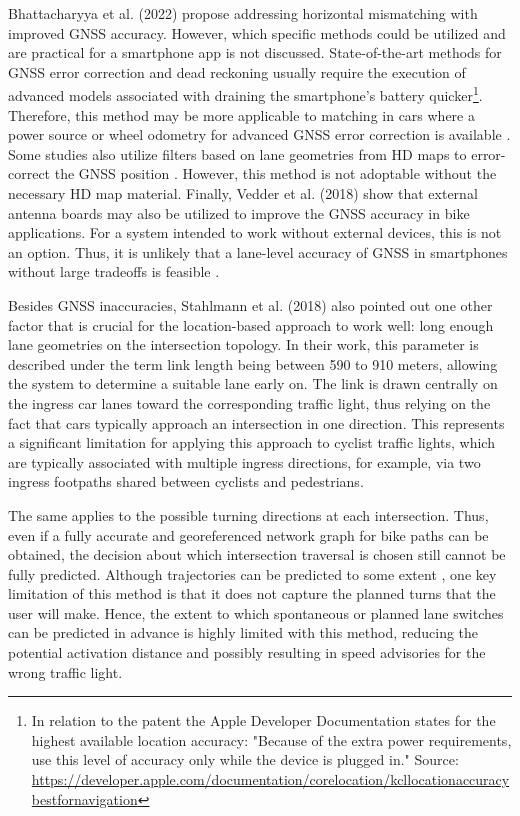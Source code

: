 Bhattacharyya et al. (2022) \cite{bhattacharyya_assessing_2022} propose addressing horizontal mismatching with improved GNSS accuracy. However, which specific methods could be utilized and are practical for a smartphone app is not discussed. State-of-the-art methods for GNSS error correction and dead reckoning usually require the execution of advanced models \cite{werner_machine_2020} associated with draining the smartphone's battery quicker\footnote{In relation to the patent \cite{werner_machine_2020} the Apple Developer Documentation states for the highest available location accuracy: "Because of the extra power requirements, use this level of accuracy only while the device is plugged in." Source: \url{https://developer.apple.com/documentation/corelocation/kcllocationaccuracybestfornavigation}}. Therefore, this method may be more applicable to matching in cars where a power source or wheel odometry for advanced GNSS error correction is available \cite{merriaux_wheel_2014}. Some studies also utilize filters based on lane geometries from HD maps to error-correct the GNSS position \cite{toledo-moreo_lane-level_2010, li_lane-level_2017}. However, this method is not adoptable without the necessary HD map material. Finally, Vedder et al. (2018) \cite{vedder_accurate_2018} show that external antenna boards may also be utilized to improve the GNSS accuracy in bike applications. For a system intended to work without external devices, this is not an option. Thus, it is unlikely that a lane-level accuracy of GNSS in smartphones without large tradeoffs is feasible \cite{lindsey_feasibility_2013}.

Besides GNSS inaccuracies, Stahlmann et al. (2018) \cite{stahlmann_exploring_2018} also pointed out one other factor that is crucial for the location-based approach to work well: long enough lane geometries on the intersection topology. In their work, this parameter is described under the term link length being between 590 to 910 meters, allowing the system to determine a suitable lane early on. The link is drawn centrally on the ingress car lanes toward the corresponding traffic light, thus relying on the fact that cars typically approach an intersection in one direction. This represents a significant limitation for applying this approach to cyclist traffic lights, which are typically associated with multiple ingress directions, for example, via two ingress footpaths shared between cyclists and pedestrians. 

The same applies to the possible turning directions at each intersection. Thus, even if a fully accurate and georeferenced network graph for bike paths can be obtained, the decision about which intersection traversal is chosen still cannot be fully predicted. Although trajectories can be predicted to some extent \cite{rudenko_human_2020}, one key limitation of this method is that it does not capture the planned turns that the user will make. Hence, the extent to which spontaneous or planned lane switches can be predicted in advance is highly limited with this method, reducing the potential activation distance and possibly resulting in speed advisories for the wrong traffic light.

